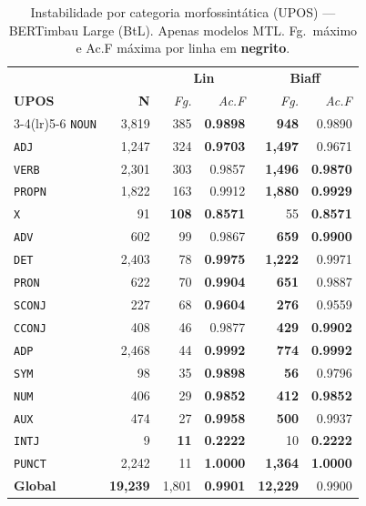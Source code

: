 \clearpage
\begin{table}[p]
\centering
\caption{Instabilidade por categoria morfossint\'atica (UPOS) --- BERTimbau Large (BtL).
Apenas modelos MTL. Fg.\ m\'aximo e Ac.F m\'axima por linha em \textbf{negrito}.}
\label{tab:instab-btl-upos}
\begingroup
\small\setlength{\tabcolsep}{6pt}\renewcommand{\arraystretch}{1.2}%
\begin{tabular}{l r| r r| r r}
\toprule
\multicolumn{2}{c|}{}
  & \multicolumn{2}{c|}{\textbf{Lin}}
  & \multicolumn{2}{c}{\textbf{Biaff}} \\
\textbf{UPOS} & \textbf{N}
  & \textit{Fg.} & \textit{Ac.F}
  & \textit{Fg.} & \textit{Ac.F} \\
\cmidrule(lr){3-4}\cmidrule(lr){5-6}
  \texttt{NOUN} & 3,819 & 385 & \textbf{0.9898} & \textbf{948} & 0.9890 \\
  \texttt{ADJ} & 1,247 & 324 & \textbf{0.9703} & \textbf{1,497} & 0.9671 \\
  \texttt{VERB} & 2,301 & 303 & 0.9857 & \textbf{1,496} & \textbf{0.9870} \\
  \texttt{PROPN} & 1,822 & 163 & 0.9912 & \textbf{1,880} & \textbf{0.9929} \\
  \texttt{X} & 91 & \textbf{108} & \textbf{0.8571} & 55 & \textbf{0.8571} \\
  \texttt{ADV} & 602 & 99 & 0.9867 & \textbf{659} & \textbf{0.9900} \\
  \texttt{DET} & 2,403 & 78 & \textbf{0.9975} & \textbf{1,222} & 0.9971 \\
  \texttt{PRON} & 622 & 70 & \textbf{0.9904} & \textbf{651} & 0.9887 \\
  \texttt{SCONJ} & 227 & 68 & \textbf{0.9604} & \textbf{276} & 0.9559 \\
  \texttt{CCONJ} & 408 & 46 & 0.9877 & \textbf{429} & \textbf{0.9902} \\
  \texttt{ADP} & 2,468 & 44 & \textbf{0.9992} & \textbf{774} & \textbf{0.9992} \\
  \texttt{SYM} & 98 & 35 & \textbf{0.9898} & \textbf{56} & 0.9796 \\
  \texttt{NUM} & 406 & 29 & \textbf{0.9852} & \textbf{412} & \textbf{0.9852} \\
  \texttt{AUX} & 474 & 27 & \textbf{0.9958} & \textbf{500} & 0.9937 \\
  \texttt{INTJ} & 9 & \textbf{11} & \textbf{0.2222} & 10 & \textbf{0.2222} \\
  \texttt{PUNCT} & 2,242 & 11 & \textbf{1.0000} & \textbf{1,364} & \textbf{1.0000} \\
\midrule
  \textbf{Global} & \textbf{19,239} & 1,801 & \textbf{0.9901} & \textbf{12,229} & 0.9900 \\
\bottomrule
\end{tabular}
\endgroup
\instablegendaMTL
\end{table}

